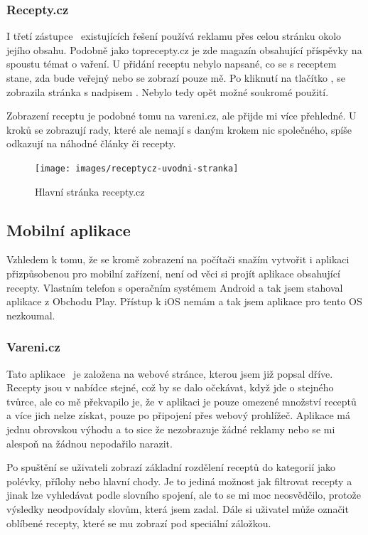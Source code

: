 \subsubsection{Recepty.cz}

I třetí zástupce~\cite{ReceptyCZ} existujících řešení používá reklamu přes celou stránku okolo jejího obsahu. Podobně jako toprecepty.cz
je zde magazín obsahující příspěvky na spoustu témat o vaření. U přidání receptu nebylo napsané, co se s receptem stane,
zda bude veřejný nebo se zobrazí pouze mě. Po kliknutí na tlačítko , se zobrazila stránka s nadpisem
. Nebylo tedy opět možné soukromé použití.

Zobrazení receptu je podobné tomu na vareni.cz, ale přijde mi více přehledné. U kroků se zobrazují rady, které ale
nemají s daným krokem nic společného, spíše odkazují na náhodné články či recepty.

\begin{figure}[H]
    \texttt{[image: images/receptycz-uvodni-stranka]}
    \caption{Hlavní stránka recepty.cz} \label{picture:receptycz:uvodni-stranka}
\end{figure}

\subsection{Mobilní aplikace}

Vzhledem k tomu, že se kromě zobrazení na počítači snažím vytvořit i aplikaci přizpůsobenou pro mobilní zařízení, není od věci
si projít aplikace obsahující recepty. Vlastním telefon s operačním systémem Android a tak jsem stahoval aplikace z Obchodu Play.
Přístup k iOS nemám a tak jsem aplikace pro tento OS nezkoumal.

\subsubsection{Vareni.cz}
Tato aplikace~\cite{VareniCZAplikace} je založena na webové stránce, kterou jsem již popsal dříve. Recepty jsou v nabídce stejné, což by se dalo očekávat,
když jde o stejného tvůrce, ale co mě překvapilo je, že v aplikaci je pouze omezené množství receptů a více jich nelze získat, pouze
po připojení přes webový prohlížeč. Aplikace má jednu obrovskou výhodu a to sice že nezobrazuje žádné reklamy nebo se mi alespoň na
žádnou nepodařilo narazit.

Po spuštění se uživateli zobrazí základní rozdělení receptů do kategorií jako polévky, přílohy nebo hlavní chody. Je to jediná možnost
jak filtrovat recepty a jinak lze vyhledávat podle slovního spojení, ale to se mi moc neosvědčilo, protože výsledky neodpovídaly slovům,
která jsem zadal. Dále si uživatel může označit oblíbené recepty, které se mu zobrazí pod speciální záložkou.

